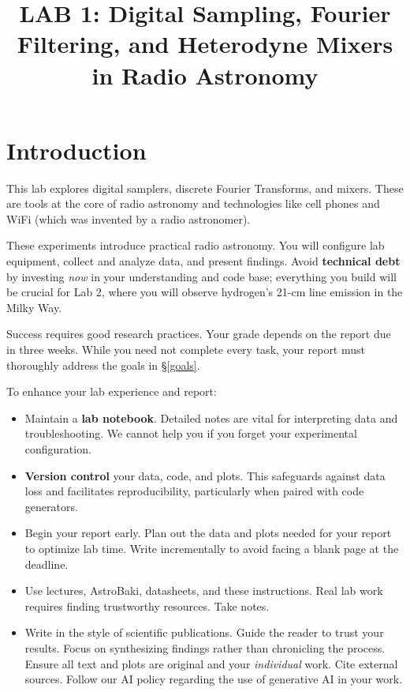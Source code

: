 \documentclass[11pt,preprint]{aastex}
\title{LAB 1: Digital Sampling, Fourier Filtering, and Heterodyne Mixers in Radio Astronomy}
\date{}
\begin{document}
\maketitle
\tableofcontents

\section{Introduction}

\noindent
This lab explores digital samplers, discrete Fourier Transforms, and mixers.
These are tools at the core of radio astronomy and technologies like cell phones and WiFi
(which was invented by a radio astronomer).

These experiments introduce practical radio astronomy.
You will configure lab equipment, collect and analyze data, and present findings.
Avoid \textbf{technical debt} by investing {\it now} in your understanding and code base;
everything you build will be crucial for Lab 2, where you will observe hydrogen's 21-cm
line emission in the Milky Way.

Success requires good research practices.
Your grade depends on the report due in three weeks.
While you need not complete every task, your report must thoroughly address
the goals in \S\ref{goals}.

To enhance your lab experience and report:

\begin{itemize}
    \item Maintain a \textbf{lab notebook}.
    Detailed notes are vital for interpreting data and troubleshooting.
    We cannot help you if you forget your experimental configuration.

    \item \textbf{Version control} your data, code, and plots.
    This safeguards against data loss and facilitates reproducibility,
    particularly when paired with code generators.

    \item Begin your report early.
    Plan out the data and plots needed for your report to optimize lab time.
    Write incrementally to avoid facing a blank page at the deadline.

    \item Use lectures, AstroBaki, datasheets, and these instructions.
    Real lab work requires finding trustworthy resources.
    Take notes.

    \item Write in the style of scientific publications.
    Guide the reader to trust your results.
    Focus on synthesizing findings rather than chronicling the process.
    Ensure all text and plots are original and your {\it individual} work.
    Cite external sources.
    Follow our AI policy regarding the use of generative AI in your work.
\end{itemize}
\end{document}
